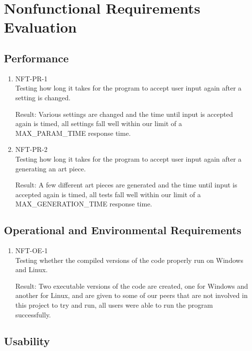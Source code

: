 \documentclass[12pt, titlepage]{article}
\begin{document}
\section{Nonfunctional Requirements Evaluation}

\subsection{Performance}

\begin{enumerate}

\item{NFT-PR-1\\}
Testing how long it takes for the program to accept user input again after a setting is changed.

Result: Various settings are changed and the time until input is accepted again is timed, all settings fall well within our limit of a MAX\_PARAM\_TIME response time.

\item{NFT-PR-2\\}
Testing how long it takes for the program to accept user input again after a generating an art piece.

Result: A few different art pieces are generated and the time until input is accepted again is timed, all tests fall well within our limit of a MAX\_GENERATION\_TIME response time.

\end{enumerate}

\subsection{Operational and Environmental Requirements}

\begin{enumerate}

\item{NFT-OE-1}\\
Testing whether the compiled versions of the code properly run on Windows and Linux.

Result: Two executable versions of the code are created, one for Windows and another for Linux, and are given to some of our peers that are not involved in this project to try and run, all users were able to run the program successfully.

\end{enumerate}

\subsection{Usability}
\end{document}
